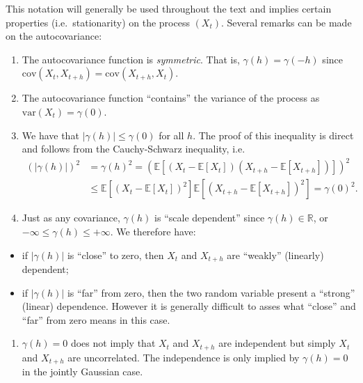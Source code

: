 \documentclass[]{book}
\providecommand{\tightlist}{%
  \setlength{\itemsep}{0pt}\setlength{\parskip}{0pt}}
\theoremstyle{definition}
\theoremstyle{definition}
\theoremstyle{definition}
\theoremstyle{remark}
\begin{document}
This notation will generally be used throughout the text and implies
certain properties (i.e.~stationarity) on the process \((X_t)\). Several
remarks can be made on the autocovariance:

\begin{enumerate}
\def\labelenumi{\arabic{enumi}.}
\tightlist
\item
  The autocovariance function is \emph{symmetric}. That is,
  \({\gamma}\left( {h} \right) = {\gamma}\left( -h \right)\) since
  \(\text{cov} \left( {{X_t},{X_{t+h}}} \right) = \text{cov} \left( X_{t+h},X_{t} \right)\).
\item
  The autocovariance function ``contains'' the variance of the process
  as \(\text{var} \left( X_{t} \right) = {\gamma}\left( 0 \right)\).
\item
  We have that \(|\gamma(h)| \leq \gamma(0)\) for all \(h\). The proof
  of this inequality is direct and follows from the Cauchy-Schwarz
  inequality, i.e. \[ \begin{aligned}
    \left(|\gamma(h)| \right)^2 &= \gamma(h)^2 = \left(\mathbb{E}\left[\left(X_t - \mathbb{E}[X_t] \right)\left(X_{t+h} - \mathbb{E}[X_{t+h}] \right)\right]\right)^2\\
    &\leq \mathbb{E}\left[\left(X_t - \mathbb{E}[X_t] \right)^2 \right] \mathbb{E}\left[\left(X_{t+h} - \mathbb{E}[X_{t+h}] \right)^2 \right] =  \gamma(0)^2. 
    \end{aligned}
    \]
\item
  Just as any covariance, \({\gamma}\left( {h} \right)\) is ``scale
  dependent'' since \({\gamma}\left( {h} \right) \in \mathbb{R}\), or
  \(-\infty \le {\gamma}\left( {h} \right) \le +\infty\). We therefore
  have:
\end{enumerate}

\begin{itemize}
\tightlist
\item
  if \(\left| {\gamma}\left( {h} \right) \right|\) is ``close'' to zero,
  then \(X_t\) and \(X_{t+h}\) are ``weakly'' (linearly) dependent;
\item
  if \(\left| {\gamma}\left( {h} \right) \right|\) is ``far'' from zero,
  then the two random variable present a ``strong'' (linear) dependence.
  However it is generally difficult to asses what ``close'' and ``far''
  from zero means in this case.
\end{itemize}

\begin{enumerate}
\def\labelenumi{\arabic{enumi}.}
\setcounter{enumi}{4}
\tightlist
\item
  \({\gamma}\left( {h} \right)=0\) does not imply that \(X_t\) and
  \(X_{t+h}\) are independent but simply \(X_t\) and \(X_{t+h}\) are
  uncorrelated. The independence is only implied by
  \({\gamma}\left( {h} \right)=0\) in the jointly Gaussian case.
\end{enumerate}
\end{document}
